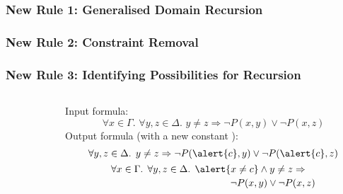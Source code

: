 \documentclass{beamer}
\begin{document}
\begin{frame}
  \frametitle<1>{New Rule 1: Generalised Domain Recursion}
  \frametitle<2>{New Rule 2: Constraint Removal}
  \frametitle<3>{New Rule 3: Identifying Possibilities for Recursion}
  \begin{columns}
    \begin{column}{0.15\textwidth}
      \centering
    \end{column}
    \begin{column}{0.85\textwidth}
      \begin{overprint}
          \begin{example}
            Input formula:
            \[
              \forall x \in \Gamma\text{. }\forall y, z \in \Delta\text{. }y \ne z \Rightarrow \neg P(x, y) \lor \neg P(x, z)
            \]
            Output formula (with a new constant ):
            \begin{gather*}
              \forall y, z \in \Delta\text{. }y \ne z \Rightarrow \neg P(\alert{c}, y) \lor \neg P(\alert{c}, z) \\
              \begin{multlined}
                \forall x \in \Gamma\text{. }\forall y, z \in \Delta\text{. }\alert{x \ne c} \land y \ne z \Rightarrow \\
                \neg P(x, y) \lor \neg P(x, z)
              \end{multlined}
            \end{gather*}
          \end{example}
          \begin{example}

\end{example}
\end{overprint}
\end{column}
\end{columns}
\end{frame}
\end{document}
